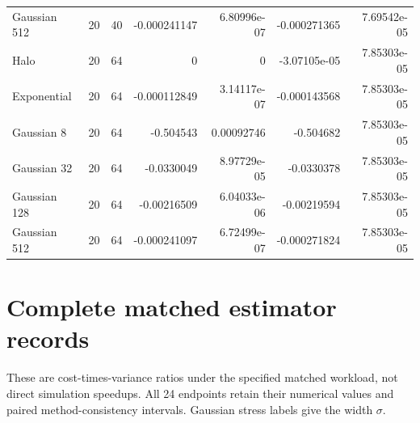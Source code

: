 \documentclass[fleqn,usenatbib]{mnras}
\begin{document}
\begin{table}
\begin{tabular}{lrrrrrr}
Gaussian 512 & 20 & 40 & -0.000241147 & 6.80996e-07 & -0.000271365 & 7.69542e-05 \\
Halo & 20 & 64 & 0 & 0 & -3.07105e-05 & 7.85303e-05 \\
Exponential & 20 & 64 & -0.000112849 & 3.14117e-07 & -0.000143568 & 7.85303e-05 \\
Gaussian 8 & 20 & 64 & -0.504543 & 0.00092746 & -0.504682 & 7.85303e-05 \\
Gaussian 32 & 20 & 64 & -0.0330049 & 8.97729e-05 & -0.0330378 & 7.85303e-05 \\
Gaussian 128 & 20 & 64 & -0.00216509 & 6.04033e-06 & -0.00219594 & 7.85303e-05 \\
Gaussian 512 & 20 & 64 & -0.000241097 & 6.72499e-07 & -0.000271824 & 7.85303e-05 \\
\bottomrule
\end{tabular}
\end{table}

\clearpage
\section{Complete matched estimator records}\label{app-cost}

These are cost-times-variance ratios under the specified matched workload, not direct simulation speedups. All 24 endpoints retain their numerical values and paired method-consistency intervals. Gaussian stress labels give the width \(\sigma\).
\end{document}
